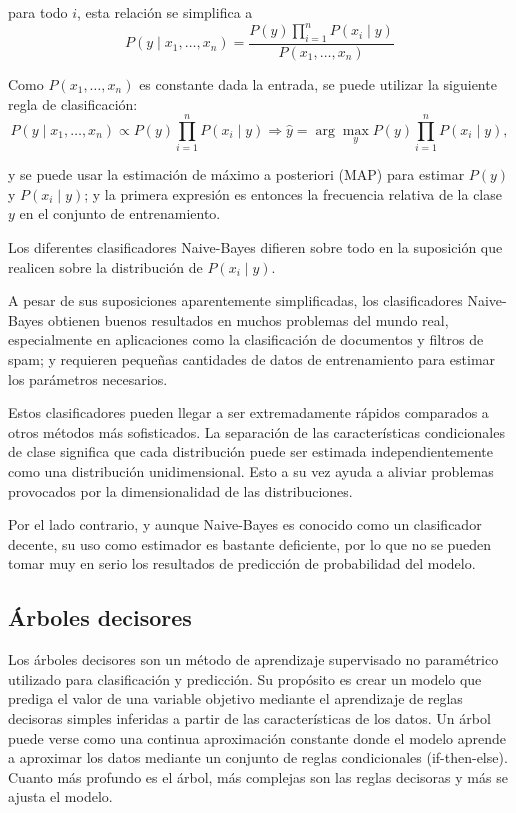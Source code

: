 para todo $i$, esta relación se simplifica a 
\begin{equation*}
    P(y\mid x_{1},\dots,x_{n})=\dfrac{P(y) \prod^{n}_{i=1} P(x_{i}\mid y)}{P(x_{1},\dots,x_{n})}
\end{equation*}

Como $P(x_{1},\dots,x_{n})$ es constante dada la entrada, se puede utilizar la siguiente regla de clasificación:
\begin{equation*}
    P(y\mid x_{1},\dots,x_{n}) \propto P(y) \prod^{n}_{i=1}P(x_{i}\mid y) \Rightarrow 
    \hat{y} = \arg \max_{y} P(y) \prod^{n}_{i=1}P(x_{i}\mid y),
\end{equation*}

y se puede usar la estimación de máximo a posteriori (MAP) para estimar $P(y)$ y $P(x_{i}\mid y)$; y la primera expresión es entonces la frecuencia relativa de la clase $y$ en el conjunto de entrenamiento.

Los diferentes clasificadores Naive-Bayes difieren sobre todo en la suposición que realicen sobre la distribución de $P(x_{i} \mid y)$.

A pesar de sus suposiciones aparentemente simplificadas, 
los clasificadores Naive-Bayes obtienen buenos resultados en muchos problemas del mundo real, 
especialmente en aplicaciones como la clasificación de documentos y filtros de spam;
y requieren pequeñas cantidades de datos de entrenamiento para estimar los parámetros necesarios.

Estos clasificadores pueden llegar a ser extremadamente rápidos comparados a otros métodos más sofisticados. La separación de las características condicionales de clase significa que cada distribución puede ser estimada independientemente como una distribución unidimensional.
Esto a su vez ayuda a aliviar problemas provocados por la dimensionalidad de las distribuciones.

Por el lado contrario, y aunque Naive-Bayes es conocido como un clasificador decente, su uso como estimador es bastante deficiente, por lo que no se pueden tomar muy en serio los resultados de predicción de probabilidad del modelo.

\subsection{Árboles decisores}


Los árboles decisores son un método de aprendizaje supervisado no paramétrico utilizado para clasificación y predicción.
Su propósito es crear un modelo que prediga el valor de una variable objetivo mediante el aprendizaje de reglas decisoras simples inferidas a partir de las características de los datos.
Un árbol puede verse como una continua aproximación constante donde el modelo aprende a aproximar los datos mediante un conjunto de reglas condicionales (if-then-else).
Cuanto más profundo es el árbol, más complejas son las reglas decisoras y más se ajusta el modelo.

